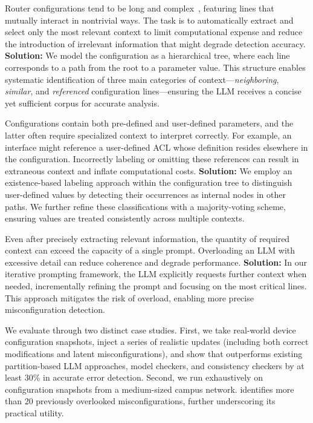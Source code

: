  Router
configurations tend to be long and
complex~\cite{benson2009complexitymetrics}, featuring lines that mutually
interact in nontrivial ways. The task is to automatically extract and select
only the most relevant context to limit computational expense and reduce the
introduction of irrelevant information that might degrade detection accuracy.
\textbf{Solution:} We model the configuration as a hierarchical tree, where
each line corresponds to a path from the root to a parameter value. This
structure enables systematic identification of three main categories of
context---\emph{neighboring}, \emph{similar}, and \emph{referenced}
configuration lines—ensuring the LLM receives a concise yet sufficient corpus
for accurate analysis.

 
Configurations contain both pre-defined and user-defined parameters, and the
latter often require specialized context to interpret correctly. For example,
an interface might reference a user-defined ACL whose definition resides
elsewhere in the configuration. Incorrectly labeling or omitting these
references can result in extraneous context and inflate computational costs.
\textbf{Solution:} We employ an existence-based labeling approach within the
configuration tree to distinguish user-defined values by detecting their
occurrences as internal nodes in other paths. We further refine these
classifications with a majority-voting scheme, ensuring values are treated
consistently across multiple contexts.

 Even after
precisely extracting relevant information, the quantity of required context
can exceed the capacity of a single prompt. Overloading an LLM with excessive
detail can reduce coherence and degrade performance. \textbf{Solution:} In our
iterative prompting framework, the LLM explicitly requests further context
when needed, incrementally refining the prompt and focusing on the most
critical lines. This approach mitigates the risk of overload, enabling more
precise misconfiguration detection.

We evaluate \sysname{} through two distinct case studies. First, we take
real-world device configuration snapshots, inject a series of realistic
updates (including both correct modifications and latent misconfigurations),
and show that \sysname{} outperforms existing partition-based LLM approaches,
model checkers, and consistency checkers by at least 30\% in accurate error
detection.  Second, we run \sysname{} exhaustively on configuration snapshots
from a medium-sized campus network. \sysname{} identifies more than 20
previously overlooked misconfigurations, further underscoring its practical
utility.
